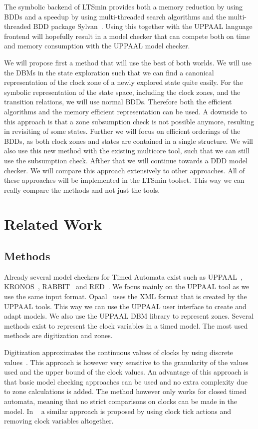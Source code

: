 \documentclass[11pt]{article}
\begin{document}
The symbolic backend of LTSmin provides both a memory reduction by using BDDs and a speedup by using multi-threaded search algorithms and the multi-threaded BDD package Sylvan~\cite{sylvan}. Using this together with the UPPAAL language frontend will hopefully result in a model checker that can compete both on time and memory consumption with the UPPAAL model checker.

We will propose first a method that will use the best of both worlds. We will use the DBMs in the state exploration such that we can find a canonical representation of the clock zone of a newly explored state quite easily. For the symbolic representation of the state space, including the clock zones, and the transition relations, we will use normal BDDs. Therefore both the efficient algorithms and the memory efficient representation can be used. A downside to this approach is that a zone subsumption check is not possible anymore, resulting in revisiting of some states. Further we will focus on efficient orderings of the BDDs, as both clock zones and states are contained in a single structure. We will also use this new method with the existing multicore tool, such that we can still use the subsumption check. Afther that we will continue towards a DDD model checker. We will compare this approach extensively to other approaches. All of these approaches will be implemented in the LTSmin toolset. This way we can really compare the methods and not just the tools.

\section{Related Work}
\subsection{Methods}
Already several model checkers for Timed Automata exist such as UPPAAL~\cite{UPPAAL}, KRONOS~\cite{kronos}, RABBIT~\cite{CAV03} and RED~\cite{crds}. We focus mainly on the UPPAAL tool as we use the same input format. Opaal~\cite{opaal} uses the XML format that is created by the UPPAAL tools. This way we can use the UPPAAL user interface to create and adapt models. We also use the UPPAAL DBM library to represent zones. Several methods exist to represent the clock variables in a timed model. The most used methods are digitization and zones. 

Digitization approximates the continuous values of clocks by using discrete values~\cite{CHARME01}. This approach is however very sensitive to the granularity of the values used and the upper bound of the clock values. An advantage of this approach is that basic model checking approaches can be used and no extra complexity due to zone calculations is added. The method however only works for closed timed automata, meaning that no strict comparisons on clocks can be made in the model. In ~\cite{nguyen2012discrete} a similar approach is proposed by using clock tick actions and removing clock variables altogether. 
\end{document}
